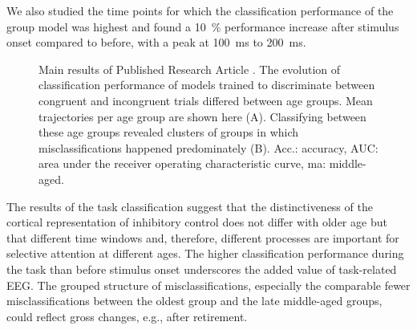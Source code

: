 We also studied the time points for which the classification performance of the group model was highest and found a 10~\% performance increase after stimulus onset compared to before, with a peak at 100~ms to 200~ms.

\begin{figure}[h]
\begin{center}

\captionsetup{justification=justified}
\caption[Main results of Published Research Article .]{Main results of Published Research Article . The evolution of classification performance of models trained to discriminate between congruent and incongruent trials differed between age groups. Mean trajectories per age group are shown here (A). Classifying between these age groups revealed clusters of groups in which misclassifications happened predominately (B). Acc.: accuracy, AUC: area under the receiver operating characteristic curve, ma: middle-aged.}
\label{fig:results2}
\end{center}
\end{figure}
\noindent The results of the task classification suggest that the distinctiveness of the cortical representation of inhibitory control does not differ with older age but that different time windows and, therefore, different processes are important for selective attention at different ages. The higher classification performance during the task than before stimulus onset underscores the added value of task-related EEG. The grouped structure of misclassifications,  especially the comparable fewer misclassifications between the oldest group and the late middle-aged groups, could reflect gross changes, e.g., after retirement. 


